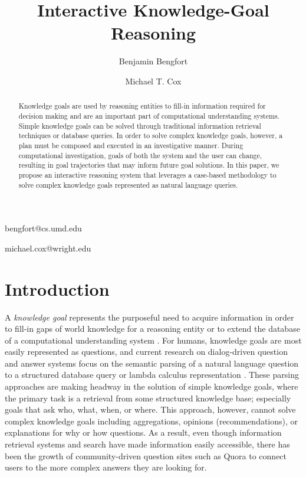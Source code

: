 \documentclass[11pt,letterpaper]{article}
\begin{document}
\title{Interactive Knowledge-Goal Reasoning}

\author{Benjamin Bengfort}{bengfort@cs.umd.edu}
\address{Department of Computer Science, University of Maryland,
         College Park, MD 20742 USA}
\author{Michael T. Cox}{michael.cox@wright.edu}
\address{Wright State Research Institute, Wright State University,
         Dayton, OH 45435 USA}
\vskip 0.2in


\begin{abstract}
Knowledge goals are used by reasoning entities to fill-in information required for decision making and are an important part of computational understanding systems. Simple knowledge goals can be solved through traditional information retrieval techniques or database queries. In order to solve complex knowledge goals, however, a plan must be composed and executed in an investigative manner. During computational investigation, goals of both the system and the user can change, resulting in goal trajectories that may inform future goal solutions. In this paper, we propose an interactive reasoning system that leverages a case-based methodology to solve complex knowledge goals represented as natural language queries.
\end{abstract}

\section{Introduction}

A \textit{knowledge goal} represents the purposeful need to acquire information in order to fill-in gaps of world knowledge for a reasoning entity or to extend the database of a computational understanding system \cite{ram_goal-based_1991}. For humans, knowledge goals are most easily represented as questions, and current research on dialog-driven question and answer systems focus on the semantic parsing of a natural language question to a structured database query \cite{yahya_natural_2012} or lambda calculus representation \cite{berant_semantic_2013}. These parsing approaches are making headway in the solution of simple knowledge goals, where the primary task is a retrieval from some structured knowledge base; especially goals that ask who, what, when, or where. This approach, however, cannot solve complex knowledge goals including aggregations, opinions (recommendations), or explanations for why or how questions. As a result, even though information retrieval systems and search have made information easily accessible, there has been the growth of community-driven question sites such as Quora \cite{wang_wisdom_2013} to connect users to the more complex answers they are looking for.
\end{document}
